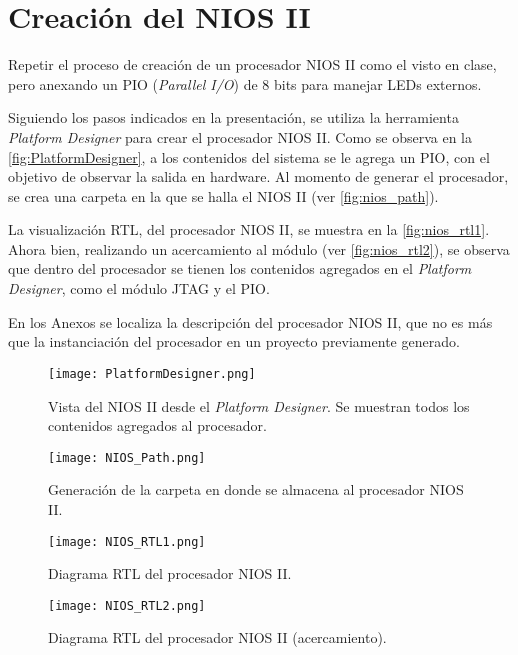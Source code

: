 \section{Creación del NIOS II \label{sec:s1}}

\begin{center}
	\begin{minipage}{12cm}
		\begin{tcolorbox}[title=Actividad 1]
			Repetir el proceso de creación de un procesador NIOS II como el visto en clase, pero anexando un PIO (\textit{Parallel I/O}) de 8 bits para manejar LEDs externos.
		\end{tcolorbox}	
	\end{minipage}
\end{center}

Siguiendo los pasos indicados en la presentación, se utiliza la herramienta \textit{Platform Designer} para crear el procesador NIOS II. Como se observa en la \autoref{fig:PlatformDesigner}, a los contenidos del sistema se le agrega un PIO, con el objetivo de observar la salida en hardware. Al momento de generar el procesador, se crea una carpeta en la que se halla el NIOS II (ver \autoref{fig:nios_path}).

La visualización RTL, del procesador NIOS II, se muestra en la \autoref{fig:nios_rtl1}. Ahora bien, realizando un acercamiento al módulo (ver \autoref{fig:nios_rtl2}), se observa que dentro del procesador se tienen los contenidos agregados en el \textit{Platform Designer}, como el módulo JTAG y el PIO.

En los Anexos se localiza la descripción del procesador NIOS II, que no es más que la instanciación del procesador en un proyecto previamente generado. 

\begin{figure}[ht]
	\centering
	\texttt{[image: PlatformDesigner.png]}
	\caption{Vista del NIOS II desde el \textit{Platform Designer}. Se muestran todos los contenidos agregados al procesador. \label{fig:PlatformDesigner}}
\end{figure}

\begin{figure}[ht]
	\centering
	\texttt{[image: NIOS\_Path.png]}
	\caption{Generación de la carpeta en donde se almacena al procesador NIOS II. \label{fig:nios_path}}
\end{figure}

\begin{figure}[ht]
	\centering
	\texttt{[image: NIOS\_RTL1.png]}
	\caption{Diagrama RTL del procesador NIOS II. \label{fig:nios_rtl1}}
\end{figure}

\begin{figure}[ht]
	\centering
	\texttt{[image: NIOS\_RTL2.png]}
	\caption{Diagrama RTL del procesador NIOS II (acercamiento). \label{fig:nios_rtl2}}
\end{figure}
